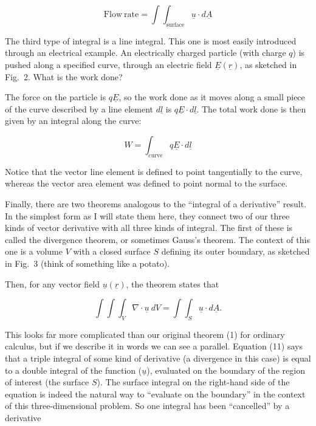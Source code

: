   $$\mathrm{Flow~rate} = \int{\int_{\mathrm{surface}}{\underline{u} \cdot 
  d\underline{A}}} \tag{9}$$ 

  The third type of integral is a line integral. This one is most easily 
  introduced through an electrical example. An electrically charged particle 
  (with charge $q$) is pushed along a specified curve, through an electric 
  field $\underline{E}(\underline{r})$, as sketched in Fig.\ 2. What is the 
  work done? 

  The force on the particle is $q\underline{E}$, so the work done as it moves 
  along a small piece of the curve described by a line element $d\underline{l}$ 
  is $q\underline{E} \cdot d\underline{l}$. The total work done is then given 
  by an integral along the curve: 

  $$W=\int_\mathrm{curve}{q\underline{E} \cdot d\underline{l}} \tag{10}$$ 

  Notice that the vector line element is defined to point tangentially to the 
  curve, whereas the vector area element was defined to point normal to the 
  surface. 


  Finally, there are two theorems analogous to the ``integral of a derivative'' 
  result. In the simplest form as I will state them here, they connect two of 
  our three kinds of vector derivative with all three kinds of integral. The 
  first of these is called the divergence theorem, or sometimes Gauss's 
  theorem. The context of this one is a volume $V$ with a closed surface $S$ 
  defining its outer boundary, as sketched in Fig.\ 3 (think of something like 
  a potato). 

  Then, for any vector field $\underline{u}(\underline{r})$, the theorem states 
  that 

  $$\int{\int{\int_V{\nabla \cdot \underline{u} \mathrm{~} 
  dV}}}=\int{\int_S{\underline{u} \cdot d\underline{A}}} . \tag{11}$$ 

  This looks far more complicated than our original theorem (1) for ordinary 
  calculus, but if we describe it in words we can see a parallel. Equation (11) 
  says that a triple integral of some kind of derivative (a divergence in this 
  case) is equal to a double integral of the function ($\underline{u}$), 
  evaluated on the boundary of the region of interest (the surface $S$). The 
  surface integral on the right-hand side of the equation is indeed the natural 
  way to ``evaluate on the boundary'' in the context of this three-dimensional 
  problem. So one integral has been ``cancelled'' by a derivative 


